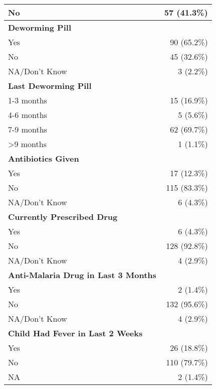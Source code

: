 \documentclass[4pt,letterpaper]{article}
\begin{document}
\begin{multicols}{2}
\begin{center}
\begin{tabular}{p{5cm}r}
No & 57 (41.3\%) \\
\midrule
\textbf{Deworming Pill} & \\
Yes & 90 (65.2\%) \\
No & 45 (32.6\%) \\
NA/Don't Know & 3 (2.2\%) \\
\midrule
\textbf{Last Deworming Pill} & \\
1-3 months & 15 (16.9\%) \\
4-6 months & 5 (5.6\%) \\
7-9 months & 62 (69.7\%) \\
\textgreater 9 months & 1 (1.1\%) \\
\midrule
\textbf{Antibiotics Given} & \\
Yes & 17 (12.3\%) \\
No & 115 (83.3\%) \\
NA/Don't Know & 6 (4.3\%) \\
\midrule
\textbf{Currently Prescribed Drug} & \\
Yes & 6 (4.3\%) \\
No & 128 (92.8\%) \\
NA/Don't Know & 4 (2.9\%) \\
\midrule
\textbf{Anti-Malaria Drug in Last 3 Months} & \\
Yes & 2 (1.4\%) \\
No & 132 (95.6\%) \\
NA/Don't Know & 4 (2.9\%) \\
\midrule
\textbf{Child Had Fever in Last 2 Weeks} & \\
Yes & 26 (18.8\%) \\
No & 110 (79.7\%) \\
NA & 2 (1.4\%) \\
\bottomrule
\end{tabular}
\end{center}


\end{multicols}
\end{document}
